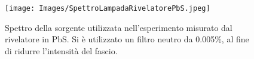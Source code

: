 \begin{figure}[h!]
    \centering
    \texttt{[image: Images/SpettroLampadaRivelatorePbS.jpeg]}
    \caption{Spettro della sorgente utilizzata nell'esperimento misurato dal rivelatore in PbS. Si è utilizzato un filtro neutro da 0.005\%, al fine di ridurre l'intensità del fascio.}
    \label{fig:my_label}
\end{figure}